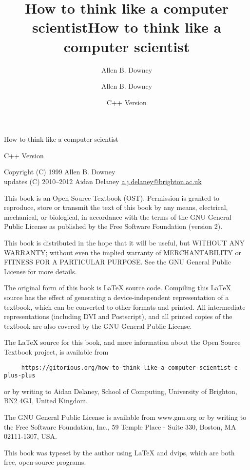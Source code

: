 \documentclass{book}
\title{How to think like a computer scientist}
\author{Allen B. Downey}
\date{}
\begin{document}
\title {How to think like a computer scientist}
\author {Allen B. Downey}
\date {C++ Version}
\maketitle

\vspace{2in}
\begin{center}
{\Large How to think like a computer scientist}

C++ Version
\vspace{0.25in}

Copyright (C) 1999  Allen B. Downey\\
updates (C) 2010--2012 Aidan Delaney \url{a.j.delaney@brighton.ac.uk}
\end{center}
\vspace{0.25in}

This book is an Open Source Textbook (OST).  Permission is
granted to reproduce, store or transmit the text of this
book by any means, electrical, mechanical, or biological,
in accordance with the terms of the GNU General Public License as
published by the Free Software Foundation (version 2).

This book is distributed in the hope that it will be useful,
but WITHOUT ANY WARRANTY; without even the implied warranty of
MERCHANTABILITY or FITNESS FOR A PARTICULAR PURPOSE.  See the GNU
General Public License for more details.

The original form of this book is LaTeX source code.
Compiling this LaTeX source has the effect of generating
a device-independent representation of a textbook, which
can be converted to other formats and printed.  All intermediate
representations (including DVI and Postscript), and all printed
copies of the textbook are also covered by the GNU General
Public License.

The LaTeX source for this book, and more information about
the Open Source Textbook project, is available from

\begin{verbatim}
     https://gitorious.org/how-to-think-like-a-computer-scientist-c-plus-plus
\end{verbatim}
%
or by writing to Aidan Delaney, School of Computing, University of Brighton, BN2 4GJ, United Kingdom.

The GNU General Public License is available from
www.gnu.org or by writing to the Free Software Foundation,
Inc., 59 Temple Place - Suite 330, Boston, MA 02111-1307, USA.

This book was typeset by the author using LaTeX and dvips,
which are both free, open-source programs.


\frontmatter
\tableofcontents

\mainmatter
















\appendix


\printindex
\end{document}
